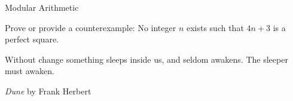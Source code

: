 \begin{section}{Modular Arithmetic}
\begin{problem}
Prove or provide a counterexample:  No integer $n$ exists such that $4n+3$ is a perfect square.
\end{problem}

%

\epigraph{Without change something sleeps inside us, and seldom awakens. The sleeper must awaken.}{\emph{Dune} by Frank Herbert}

\end{section}

